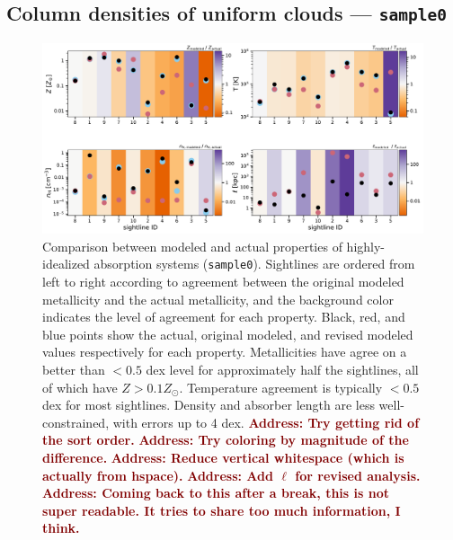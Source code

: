 \documentclass[fleqn,usenatbib]{mnras}
\newcommand{\todo}[1]{\textcolor{Maroon}{\textbf{Address: #1}}}
\begin{document}
\subsection{Column densities of uniform clouds --- \texttt{sample0}}
\label{s: results -- sample0}

\begin{figure}
    \centering
    \includegraphics[width=\textwidth]{figures/sample0/comparison.pdf}
    \caption{
    Comparison between modeled and actual properties of highly-idealized absorption systems (\texttt{sample0}).
    Sightlines are ordered from left to right according to agreement between the original modeled metallicity and the actual metallicity, and the background color indicates the level of agreement for each property.
    Black, red, and blue points show the actual, original modeled, and revised modeled values respectively for each property.
    Metallicities have agree on a better than $<0.5$ dex level for approximately half the sightlines, all of which have $Z > 0.1 Z_\odot$.
    Temperature agreement is typically $<0.5$ dex for most sightlines.
    Density and absorber length are less well-constrained, with errors up to 4 dex.
    \todo{Try getting rid of the sort order.}
    \todo{Try coloring by magnitude of the difference.}
    \todo{Reduce vertical whitespace (which is actually from hspace).}
    \todo{Add $\ell$ for revised analysis.}
    \todo{Coming back to this after a break, this is not super readable.
    It tries to share too much information, I think.}
    }
    \label{f: idealized}
\end{figure}
\end{document}
